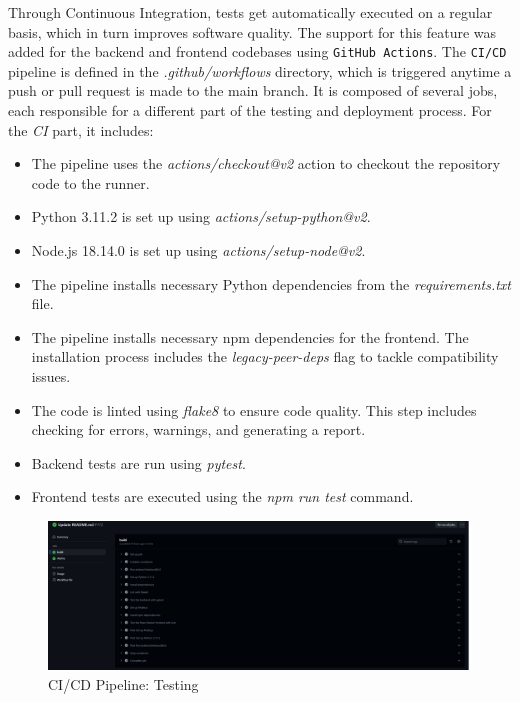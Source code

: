 Through Continuous Integration, tests get automatically executed on a regular basis, which in turn improves software quality. The support for this feature was added for the backend and frontend codebases using \texttt{GitHub Actions}. The \texttt{CI/CD} pipeline is defined in the \textit{.github/workflows} directory, which is triggered anytime a push or pull request is made to the main branch. It is composed of several jobs, each responsible for a different part of the testing and deployment process. For the \textit{CI} part, it includes:

\begin{itemize}
    \item The pipeline uses the \textit{actions/checkout@v2} action to checkout the repository code to the runner.
    \item Python 3.11.2 is set up using \textit{actions/setup-python@v2}.
    \item Node.js 18.14.0 is set up using \textit{actions/setup-node@v2}.
    \item The pipeline installs necessary Python dependencies from the \textit{requirements.txt} file.
    \item The pipeline installs necessary npm dependencies for the frontend. The installation process includes the \textit{legacy-peer-deps} flag to tackle compatibility issues.
    \item The code is linted using \textit{flake8} to ensure code quality. This step includes checking for errors, warnings, and generating a report.
    \item Backend tests are run using \textit{pytest}.
    \item Frontend tests are executed using the \textit{npm run test} command.
\end{itemize}

\begin{figure}[!ht]
    \centering
    \includegraphics[width=1\linewidth]{LATEX/Appendices/Images/Pipeline_CI_CD/github_actions_CI_CD_pipeline_testing.png}
    \caption{CI/CD Pipeline: Testing}
    \label{fig:CI/CD-Pipeline-testing}
\end{figure}

